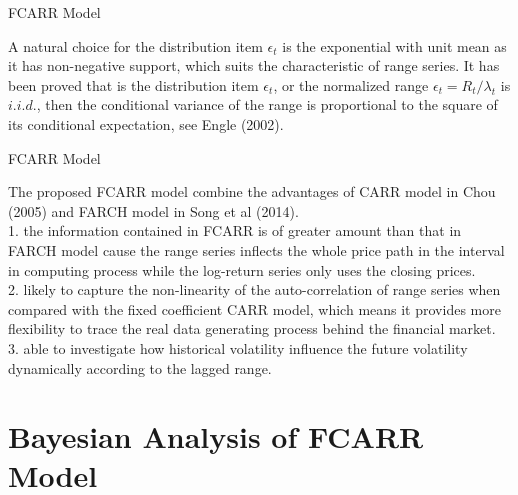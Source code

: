 \documentclass{beamer}
\begin{document}
\begin{frame}{FCARR Model}
  \begin{itemsize}
  \item {   
     A natural choice for the distribution item $\epsilon_t$ is the exponential with unit mean as it has non-negative support, which suits the characteristic of range series. It has been proved that is the distribution item $\epsilon_t$, or the normalized range $\epsilon_t=R_t/\lambda_t$  is $i.i.d.$, then the conditional variance of the range is proportional to the square of its conditional expectation, see Engle (2002).
     
  }
  \end{itemsize}
\end{frame}

\begin{frame}{FCARR Model}
  \begin{itemsize}
    \item{
    The proposed FCARR model combine the advantages of CARR model in Chou (2005) and FARCH model in Song et al (2014).\\
    \vspace{8pt}
    1. the information contained in FCARR is of greater amount than that in FARCH model cause the range series inflects the whole price path in the interval in computing process while the log-return series only uses the closing prices. \\
    \vspace{8pt}
    2. likely to capture the non-linearity of the auto-correlation of range series when compared with the fixed coefficient CARR model, which means it provides more flexibility to trace the real data generating process behind the financial market. \\
    \vspace{8pt}
    3. able to investigate how historical volatility influence the future volatility dynamically according to the lagged range. 
    }
  \end{itemsize}
\end{frame}

\section{Bayesian Analysis of FCARR Model}
\end{document}
